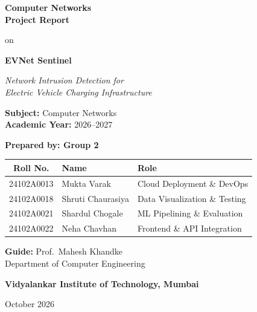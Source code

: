 \documentclass[11pt, a4paper]{article}
\begin{document}
\begin{titlepage}
    \centering
    \vspace*{1cm}

    {\Huge \bfseries Computer Networks\\[0.3cm] Project Report\par}
    \vspace{0.5cm}
    {\large on\par}
    \vspace{0.5cm}

    {\Huge \bfseries\textcolor{primary}{EVNet Sentinel}\par}
    \vspace{0.2cm}
    {\Large\textit{Network Intrusion Detection for\\Electric Vehicle Charging Infrastructure}\par}

    \vspace{1.2cm}

    \begin{tcolorbox}[colback=lightbg, colframe=primary!50, arc=6pt, boxrule=0.6pt, width=0.75\textwidth]
        \centering
        {\large \textbf{Subject:} Computer Networks}\\[0.2cm]
        {\large \textbf{Academic Year:} 2026--2027}
    \end{tcolorbox}

    \vspace{1cm}

    {\Large \bfseries Prepared by: Group 2\par}
    \vspace{0.5cm}
    {\large
    \begin{tabular}{|c|l|l|}
        \hline
        \textbf{Roll No.} & \textbf{Name} & \textbf{Role} \\ \hline
        24102A0013 & Mukta Varak & Cloud Deployment \& DevOps \\ \hline
        24102A0018 & Shruti Chaurasiya & Data Visualization \& Testing \\ \hline
        24102A0021 & Shardul Chogale & ML Pipelining \& Evaluation \\ \hline
        24102A0022 & Neha Chavhan & Frontend \& API Integration \\ \hline
    \end{tabular}
    \par}

    \vspace{1cm}

    {\large \textbf{Guide:} Prof.\ Mahesh Khandke\\
    Department of Computer Engineering\par}

    \vfill

    {\Large \bfseries Vidyalankar Institute of Technology, Mumbai\par}
    \vspace{0.2cm}
    {\large October 2026\par}
\end{titlepage}
\end{document}
